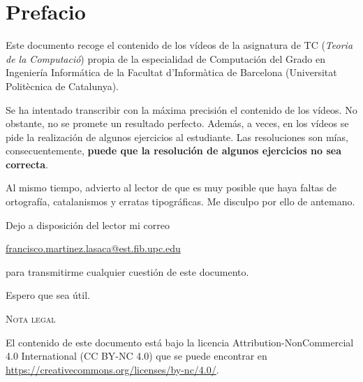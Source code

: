 \section*{Prefacio}

Este documento recoge el contenido de los vídeos de la asignatura de TC (\textit{Teoria de la Computació}) propia de la especialidad de Computación del Grado en Ingeniería Informática de la Facultat d'Informàtica de Barcelona (Universitat Politècnica de Catalunya).

Se ha intentado transcribir con la máxima precisión el contenido de los vídeos. No obstante, no se promete un resultado perfecto. Además, a veces, en los vídeos se pide la realización de algunos ejercicios al estudiante. Las resoluciones son mías, consecuentemente, \textbf{puede que la resolución de algunos ejercicios no sea correcta}.

Al mismo tiempo, advierto al lector de que es muy posible que haya faltas de ortografía, catalanismos y erratas tipográficas. Me disculpo por ello de antemano.

Dejo a disposición del lector mi correo

\href{mailto:francisco.martinez.lasaca@est.fib.upc.edu}{francisco.martinez.lasaca@est.fib.upc.edu}

para transmitirme cualquier cuestión de este documento.

Espero que sea útil.

\vfill


\textsc{Nota legal}

El contenido de este documento está bajo la licencia Attribution-NonCommercial 4.0 International (CC BY-NC 4.0) que se puede encontrar en \url{https://creativecommons.org/licenses/by-nc/4.0/}.